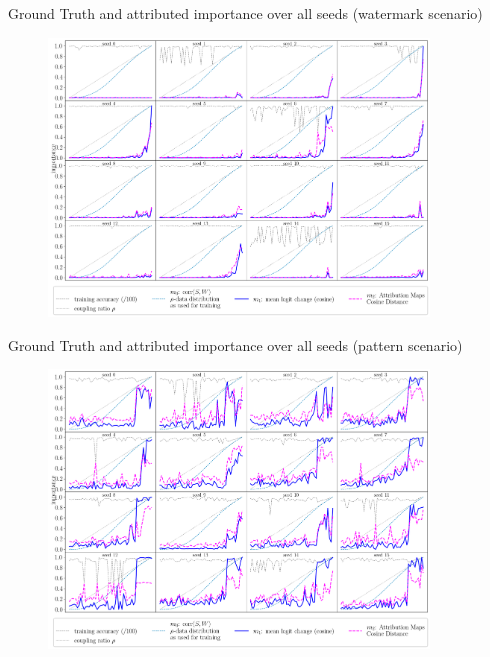 \documentclass[German, aspectratio=169]{beamer}
\begin{document}
\begin{frame}[noframenumbering]
    Ground Truth and attributed importance over all seeds (watermark scenario)
    \begin{figure}[t!]
        \centering
        \includegraphics[width=0.9\textwidth]{images/compare_seeds_mac.png}
        \label{fig:compare_seeds_mac}
    \end{figure}
\end{frame}
\begin{frame}[noframenumbering]
    Ground Truth and attributed importance over all seeds (pattern scenario)
    \begin{figure}[t!]
        \centering
        \includegraphics[width=0.9\textwidth]{images/compare_seeds_overlap.png}
        \label{fig:compare_seeds_overlap}
    \end{figure}
\end{frame}
\end{document}
